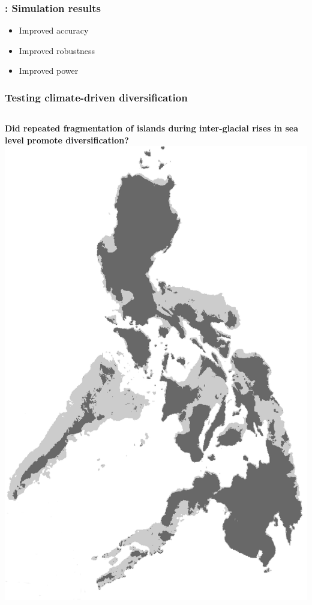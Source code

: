 \begin{frame}
    \frametitle{\dppmsbayes: Simulation results}
    \begin{itemize}
        \item Improved accuracy
        \item Improved robustness
        \item Improved power
    \end{itemize}
\end{frame}

\begin{frame}
    \frametitle{Testing climate-driven diversification}
    \begin{columns}[c]
    \textbf{Did repeated fragmentation of islands during inter-glacial rises in sea level
    promote diversification?}\\
            \includegraphics[width=\textwidth]{images/maps/Philippines.png}
    \end{columns}
\end{frame}

